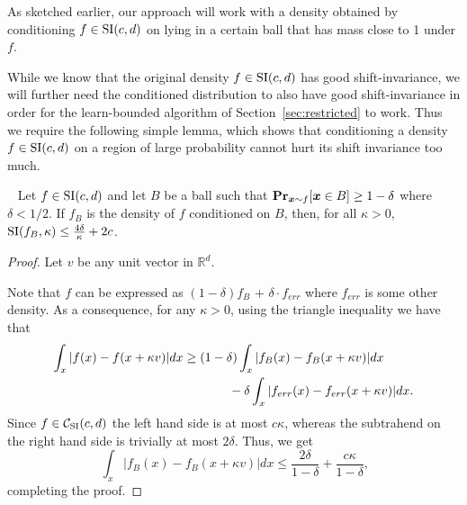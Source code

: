 As sketched earlier, our approach will work with a density 
obtained by conditioning $f \in {\mathrm{SI}}(c,d)$ on lying in a certain ball that has mass close to 1 under $f$.
While we know that the original density $f \in {\mathrm{SI}}(c,d)$ has
good shift-invariance, we will further need the
conditioned distribution to also have good shift-invariance
in order for the \textsf{learn-bounded} algorithm of Section~\ref{sec:restricted} to work.  Thus we require the following
simple lemma, which shows that conditioning a density $f \in {\mathrm{SI}}(c,d)$
on a region of large probability cannot hurt its shift invariance too much.

\begin{lemma}~\label{lem:restrict-si}
Let $f \in {\mathrm{SI}}(c,d)$ and 
let $B$ be a ball such that $\operatorname{{\bf Pr}}_{\boldsymbol{x} \sim f} [\boldsymbol{x} \in B] \ge 1- \delta$ where $\delta < 1/2$. 
If $f_B$ is the density of $f$ conditioned on $B$,
then,
for all $\kappa > 0$,
${\mathrm{SI}}(f_B,\kappa) \leq \frac{4\delta}{\kappa} + 2 c$.
\end{lemma}
\begin{proof}
Let $v$ be any unit vector in $\mathbb{R}^d$.
Note that $f$ can be expressed as $(1-\delta)f_B$ + $\delta \cdot f_{err}$ where $f_{err}$ is some other density. As a consequence, for any $\kappa > 0$,
using the triangle inequality we have that
\begin{align*}
\int_x |f(x) - f(x + \kappa v )| dx &\ge (1-\delta) \int_x |f_B(x) - f_B(x + \kappa   v)| dx \\
& \hspace{0.5in} - \delta  \int_x |f_{err}(x) - f_{err}(x + \kappa   v)| dx.
\end{align*}
Since $f \in \mathcal{C}_{\mathrm{SI}}(c,d)$ the left hand side is at most  $c \kappa$, whereas the subtrahend  on the right hand side is trivially at most $2\delta$. Thus, we get
\begin{equation}~\label{eq:shift-B-bound-1}
\int_x |f_B(x) - f_B(x + \kappa  v)| dx  \leq \frac{2\delta}{1-\delta} + \frac{c \kappa}{1-\delta},
\end{equation}
completing the proof.
\end{proof}


